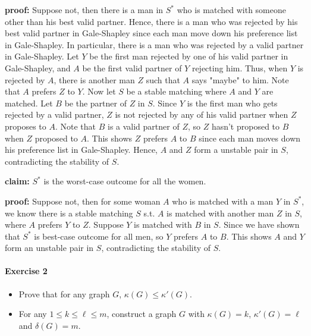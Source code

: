 \documentclass[a4paper,12pt]{article}
\begin{document}
\textbf{proof:} Suppose not, then there is a man in \(S^*\) who is matched with someone other than his best valid partner. Hence, there is a man who was rejected by his best valid partner in Gale-Shapley since each man move down his preference list in Gale-Shapley. In particular, there is a man who was rejected by a valid partner in Gale-Shapley. Let \(Y\) be the first man rejected by one of his valid partner in Gale-Shapley, and \(A\) be the first valid partner of \(Y\) rejecting him. Thus, when \(Y\) is rejected by \(A\), there is another man \(Z\) such that \(A\) says "maybe" to him. Note that \(A\) prefers \(Z\) to \(Y\). Now let \(S\) be a stable matching where \(A\) and \(Y\) are matched. Let \(B\) be the partner of \(Z\) in \(S\). Since \(Y\) is the first man who gets rejected by a valid partner, \(Z\) is not rejected by any of his valid partner when \(Z\) proposes to \(A\). Note that \(B\) is a valid partner of \(Z\), so \(Z\) hasn't proposed to \(B\) when \(Z\) proposed to \(A\). This shows \(Z\) prefers \(A\) to \(B\) since each man moves down his preference list in Gale-Shapley. Hence, \(A\) and \(Z\) form a unstable pair in \(S\), contradicting the stability of \(S\).

\textbf{claim:} \(S^*\) is the worst-case outcome for all the women. 

\textbf{proof:} Suppose not, then for some woman \(A\) who is matched with a man \(Y\) in \(S^*\), we know there is a stable matching \(S\) s.t. \(A\) is matched with another man \(Z\) in \(S\), where \(A\) prefers \(Y\) to \(Z\). Suppose \(Y\) is matched with \(B\) in \(S\). Since we have shown that \(S^*\) is best-case outcome for all men, so \(Y\) prefers \(A\) to \(B\). This shows \(A\) and \(Y\) form an unstable pair in \(S\), contradicting the stability of \(S\).            

\paragraph{Exercise 2}  
\vspace{-0.2cm}
\begin{itemize}
	\item[(a)] Prove that for any graph $G$, $\kappa(G) \le \kappa'(G)$.
	\item[(b)] For any $1 \le k \le \ell \le m$, construct a graph $G$ with $\kappa(G) = k$, $\kappa'(G) = \ell$ and $\delta(G) = m$.
\end{itemize}
\end{document}
